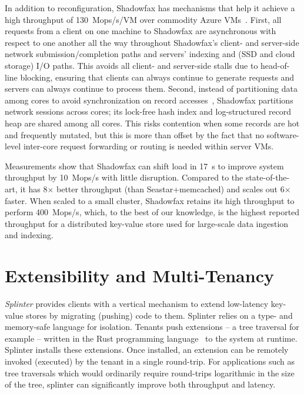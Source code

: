 In addition to reconfiguration, Shadowfax has mechanisms that help it
achieve a high throughput of 130~Mops/s/VM over
commodity Azure VMs~\cite{azure}.
%
First, all requests from a client on one machine to Shadowfax are asynchronous with
respect to one another all the way throughout Shadowfax's client- and
server-side network submission/completion paths and servers' indexing and
(SSD and cloud storage) I/O paths.
%
This avoids all client- and server-side stalls due to head-of-line
blocking, ensuring that clients can always continue to generate requests and
servers can always continue to process them.
%
Second, instead of partitioning data among cores to avoid synchronization on record
accesses~\cite{hstore,voltdb,mica,seastar}, Shadowfax partitions network
sessions across cores; its lock-free hash index and log-structured record heap
are shared among all cores.
%
This risks contention when some records are hot and frequently
mutated, but this is more than offset by the fact that no software-level
inter-core request forwarding or routing is needed within server VMs.

Measurements show that Shadowfax can shift load in 17~s to improve system throughput by
10~Mops/s
with little disruption. Compared to the state-of-the-art, it has 8$\times{}$ better throughput
  (than Seastar+memcached) and scales out 6$\times{}$ faster.
%
When scaled to a small cluster, Shadowfax retains its high throughput to
perform 400~Mops/s,
%
which, to the best of our knowledge, is the highest
reported throughput for a distributed key-value store used for
large-scale data ingestion and indexing.

\section{Extensibility and Multi-Tenancy}

\emph{Splinter} provides clients with a vertical mechanism
to extend low-latency key-value stores by migrating (pushing) code to them.
%
Splinter relies on a type- and memory-safe language for isolation.
%
Tenants push
extensions – a tree traversal for example – written in the Rust
programming language~\cite{rust} to the system at runtime.
%
Splinter installs
these extensions.
%
Once installed, an extension can
be remotely invoked (executed) by the tenant in a
single round-trip.
%
For applications such as tree traversals which would ordinarily require
round-trips logarithmic in the size of the tree, splinter can
significantly improve both throughput and latency.

